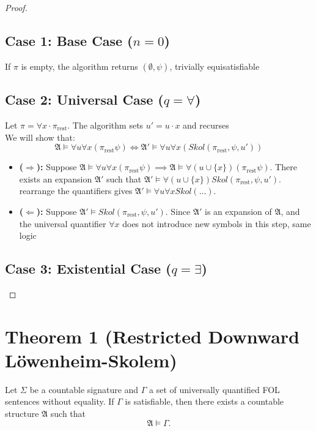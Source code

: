 \documentclass{article}
\begin{document}
\begin{proof}
\subsection*{Case 1: Base Case ($n = 0$)}
If $\pi$ is empty, the algorithm returns $(\emptyset, \psi)$, trivially equisatisfiable

\subsection*{Case 2: Universal Case ($q = \forall$)}
Let $\pi = \forall x \cdot \pi_{\text{rest}}$. The algorithm sets $u' = u \cdot x$ and recurses\\
We will show that:
$$\mathfrak{A} \models \forall u \forall x (\pi_{\text{rest}} \psi) \iff \mathfrak{A}' \models \forall u \forall x ({Skol}(\pi_{\text{rest}}, \psi, u'))$$

\begin{itemize}
    \item \textbf{ ($\Rightarrow$):} Suppose $\mathfrak{A} \models \forall u \forall x (\pi_{\text{rest}} \psi)\implies \mathfrak{A} \models \forall (u \cup \{x\}) (\pi_{\text{rest}} \psi)$. 
    There exists an expansion $\mathfrak{A}'$ such that $\mathfrak{A}' \models \forall (u \cup \{x\}) {Skol}(\pi_{\text{rest}}, \psi, u')$. rearrange the quantifiers gives $\mathfrak{A}' \models \forall u \forall x {Skol}(\dots)$.
    \item \textbf{ ($\Leftarrow$):} Suppose $\mathfrak{A}' \models {Skol}(\pi_{\text{rest}}, \psi, u')$. Since $\mathfrak{A}'$ is an expansion of $\mathfrak{A}$, and the universal quantifier $\forall x$ 
    does not introduce new symbols in this step, same logic 
\end{itemize}

\subsection*{Case 3: Existential Case ($q = \exists$)}

\end{proof}


\section*{Theorem 1 (Restricted Downward Löwenheim-Skolem)}
Let $\Sigma$ be a countable signature and $\Gamma$ a set of universally quantified FOL sentences without equality.  
If $\Gamma$ is satisfiable, then there exists a countable structure $\mathfrak{A}$ such that
\[
\mathfrak{A} \models \Gamma.
\]
\end{document}
